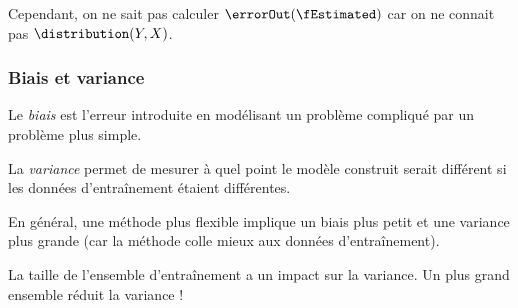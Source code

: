             Cependant, on ne sait pas calculer \(\errorOut(\fEstimated)\) car on ne connait pas \(\distribution(Y, X)\).

        \subsubsection{Biais et variance}
            \begin{definition}
                Le \textit{biais} est l'erreur introduite en modélisant un problème compliqué par un problème plus simple.

                La \textit{variance} permet de mesurer à quel point le modèle construit serait différent si les données d'entraînement étaient différentes.
            \end{definition}

            En général, une méthode plus flexible implique un biais plus petit et une variance plus grande (car la méthode colle mieux aux données d'entraînement).

            \begin{remarque}
                La taille de l'ensemble d'entraînement a un impact sur la variance. Un plus grand ensemble réduit la variance !
            \end{remarque}

    
    